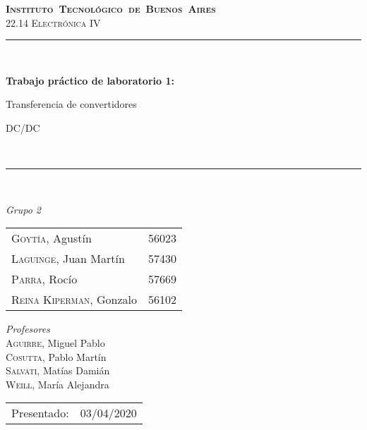 \begin{titlepage}
\newcommand{\HRule}{\rule{\linewidth}{0.5mm}}
\center
\mbox{\textsc{\LARGE \bfseries {Instituto Tecnol\'ogico de Buenos Aires}}}\\[1.5cm]
\textsc{\Large 22.14 Electr\'onica IV}\\[0.5cm]


\HRule \\[0.6cm]
{ \Huge \bfseries Trabajo pr\'actico de laboratorio  1: 

 Transferencia de convertidores 

\vspace{0.4cm} 
 DC/DC}\\[0.4cm] %
\HRule \\[1.5cm]


{\large

\emph{Grupo 2}\\
\vspace{3px}

\begin{tabular}{lr} 	
\textsc{Goyt\'ia}, Agust\'in  & 56023 \\
\textsc{Laguinge}, Juan Mart\'in  & 57430 \\
\textsc{Parra}, Roc\'io  & 57669 \\
\textsc{Reina Kiperman}, Gonzalo  & 56102 \\
\end{tabular}

\vspace{20px}

\emph{Profesores}\\
\vspace{3px}
\textsc{Aguirre}, Miguel Pablo\\ 
\textsc{Cosutta}, Pablo Mart\'in\\ 
\textsc{Salvati}, Mat\'ias Dami\'an\\	
\textsc{Weill}, Mar\'ia Alejandra\\ 	

\vspace{100px}

\begin{tabular}{ll}

Presentado: & 03/04/2020\\

\end{tabular}

}

\vfill

\end{titlepage}